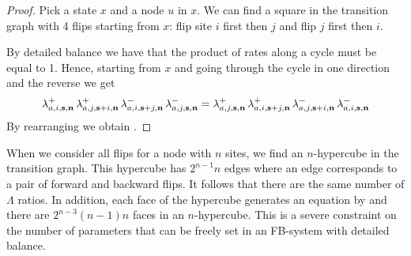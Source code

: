 \begin{proof}
  Pick a state $x$ and a node $u$ in $x$.
  We can find a square in the transition graph
  with 4 flips starting from $x$:
  flip site $i$ first then $j$ and flip $j$ first then $i$.
  \begin{center}
  \end{center}
  By detailed balance we have that
  the product of rates along a cycle must be equal to 1.
  Hence, starting from $x$ and going through the cycle
  in one direction and the reverse we get
  \begin{equation*}
    \lambda^+_{a,i,\boldsymbol{\mathbf{s}},\boldsymbol{\mathbf{n}}} \,
    \lambda^+_{a,j,\boldsymbol{\mathbf{s}}+i,\boldsymbol{\mathbf{n}}} \,
    \lambda^-_{a,i,\boldsymbol{\mathbf{s}}+j,\boldsymbol{\mathbf{n}}} \,
    \lambda^-_{a,j,\boldsymbol{\mathbf{s}},\boldsymbol{\mathbf{n}}} =
    \lambda^+_{a,j,\boldsymbol{\mathbf{s}},\boldsymbol{\mathbf{n}}} \,
    \lambda^+_{a,i,\boldsymbol{\mathbf{s}}+j,\boldsymbol{\mathbf{n}}} \,
    \lambda^-_{a,j,\boldsymbol{\mathbf{s}}+i,\boldsymbol{\mathbf{n}}} \,
    \lambda^-_{a,i,\boldsymbol{\mathbf{s}},\boldsymbol{\mathbf{n}}}
  \end{equation*}
  By rearranging we obtain .
\end{proof}

When we consider all flips for a node with $n$ sites,
we find an $n$-hypercube in the transition graph.
This hypercube has $2^{n-1} n$ edges
where an edge corresponds to a pair of forward and backward flips.
It follows that there are the same number of $\Lambda$ ratios.
In addition, each face of the hypercube generates an equation
by  %
and there are $2^{n-3} (n-1) n$ faces in an $n$-hypercube.
This is a severe constraint on the number of parameters
that can be freely set in an FB-system with detailed balance.

